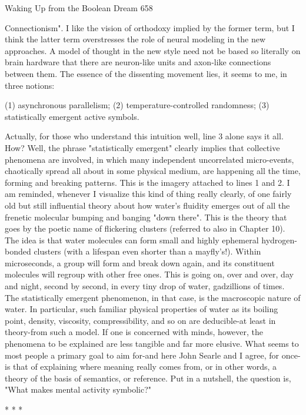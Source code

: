 Waking Up from the Boolean Dream                                                     658

Connectionism". I like the vision of orthodoxy implied by the former term, but I think
the latter term overstresses the role of neural modeling in the new approaches. A
model of thought in the new style need not be based so literally on brain hardware that
there are neuron-like units and axon-like connections between them. The essence of
the dissenting movement lies, it seems to me, in three notions:

       (1) asynchronous parallelism;
       (2) temperature-controlled randomness;
       (3) statistically emergent active symbols.

Actually, for those who understand this intuition well, line 3 alone says it all. How?
Well, the phrase "statistically emergent" clearly implies that collective phenomena are
involved, in which many independent uncorrelated micro-events, chaotically spread
all about in some physical medium, are happening all the time, forming and breaking
patterns. This is the imagery attached to lines 1 and 2.
        I am reminded, whenever I visualize this kind of thing really clearly, of one
fairly old but still influential theory about how water's fluidity emerges out of all the
frenetic molecular bumping and banging "down there". This is the theory that goes by
the poetic name of flickering clusters (referred to also in Chapter 10). The idea is that
water molecules can form small and highly ephemeral hydrogen-bonded clusters
(with a lifespan even shorter than a mayfly's!). Within microseconds, a group will
form and break down again, and its constituent molecules will regroup with other free
ones. This is going on, over and over, day and night, second by second, in every tiny
drop of water, gadzillions of times. The statistically emergent phenomenon, in that
case, is the macroscopic nature of water. In particular, such familiar physical
properties of water as its boiling point, density, viscosity, compressibility, and so on
are deducible-at least in theory-from such a model.
        If one is concerned with minds, however, the phenomena to be explained are
less tangible and far more elusive. What seems to most people a primary goal to aim
for-and here John Searle and I agree, for once-is that of explaining where meaning
really comes from, or in other words, a theory of the basis of semantics, or reference.
Put in a nutshell, the question is, "What makes mental activity symbolic?"

                                       *   *   *

